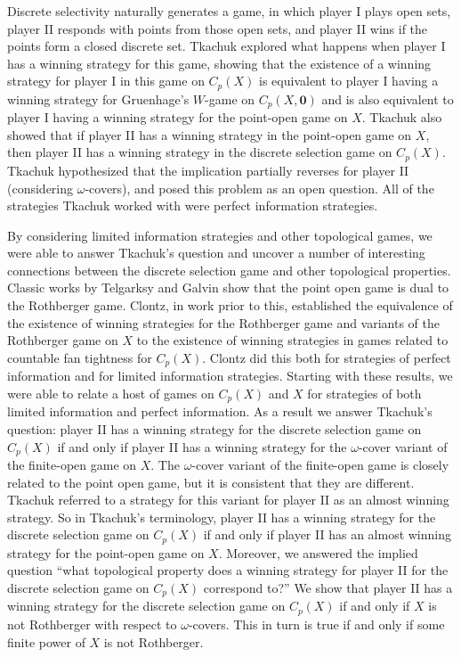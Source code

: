 \documentclass{amsart}
\theoremstyle{plain}
\theoremstyle{definition}
\theoremstyle{remark}
\theoremstyle{plain}
\theoremstyle{definition}
\theoremstyle{remark}
\begin{document}
Discrete selectivity naturally generates a game, in which player I plays open sets, player II responds with points from those open sets, and player II wins if the points form a closed discrete set.
Tkachuk explored what happens when player I has a winning strategy for this game, showing that the existence of a winning strategy for player I in this game on \(C_p(X)\) is equivalent to player I having a winning strategy for Gruenhage's \(W\)-game on \(C_p(X,\mathbf 0)\) and is also equivalent to player I having a winning strategy for the point-open game on \(X\)\cite{Tkachuk3}.
Tkachuk also showed that if player II has a winning strategy in the point-open game on \(X\), then player II has a winning strategy in the discrete selection game on \(C_p(X)\).
Tkachuk hypothesized that the implication partially reverses for player II
(considering \(\omega\)-covers), and posed this problem as an open question.
All of the strategies Tkachuk worked with were perfect information strategies.

By considering limited information strategies and other topological games, we were able to answer Tkachuk's question and uncover a number of interesting connections between the discrete selection game and other topological properties.
Classic works by Telgarksy and Galvin show that the point open game is dual to the Rothberger game\cite{Galvin}.
Clontz, in work prior to this, established the equivalence of the existence of winning strategies for the Rothberger game and variants of the Rothberger game on \(X\) to the existence of winning strategies in games related to countable fan tightness for \(C_p(X)\)\cite{Clontz1}.
Clontz did this both for strategies of perfect information and for limited information strategies.
Starting with these results, we were able to relate a host of games on \(C_p(X)\) and \(X\) for strategies of both limited information and perfect information.
As a result we answer Tkachuk's question: player II has a winning strategy for the discrete selection game on \(C_p(X)\) if and only if player II has a winning strategy for the \(\omega\)-cover variant of the finite-open game on \(X\).
The \(\omega\)-cover variant of the finite-open game is closely related to the point open game, but it is consistent that they are different.
Tkachuk referred to a strategy for this variant for player II as an almost winning strategy.
So in Tkachuk's terminology, player II has a winning strategy for the discrete selection game on \(C_p(X)\) if and only if player II has an almost winning strategy for the point-open game on \(X\).
Moreover, we answered the implied question ``what topological property does a winning strategy for player II for the discrete selection game on \(C_p(X)\) correspond to?''
We show that player II has a winning strategy for the discrete selection game on \(C_p(X)\) if and only if \(X\) is not Rothberger with respect to \(\omega\)-covers.
This in turn is true if and only if some finite power of \(X\) is not Rothberger.
\end{document}
